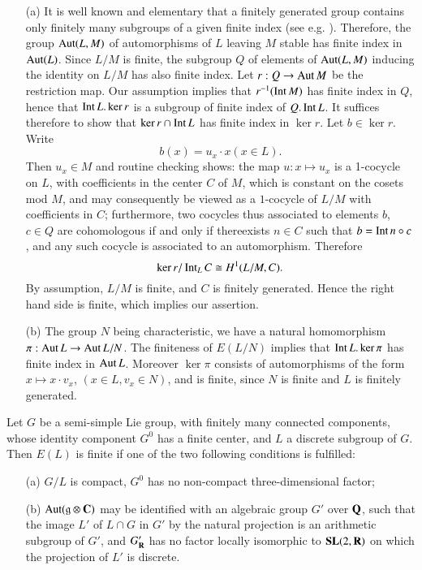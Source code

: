 \begin{itemize}
\item[(a)] It is well known and elementary that a finitely generated group contains only finitely many subgroups of a given finite index (see e.g. \cite{art04-key11}). Therefore, the group $\operatorname{\mathrm{Aut}} (L,M)$ of automorphisms of $L$ leaving $M$ stable has finite index in $\operatorname{\mathrm{Aut}}(L)$. Since $L/M$ is finite, the subgroup $Q$ of elements of $\operatorname{\mathrm{Aut}}(L,M)$ inducing the identity on $L/M$ has also finite index. Let $r:Q\to \operatorname{\mathrm{Aut}} M$ be the restriction map. Our assumption implies that $r^{-1}(\operatorname{\mathrm{Int}} M)$ has finite index in $Q$, hence that $\operatorname{\mathrm{Int}} L. \ker r$ is a subgroup of finite index of $Q. \operatorname{\mathrm{Int}} L$. It suffices therefore to show that $\ker r\cap \operatorname{\mathrm{Int}} L$ has finite index in $\ker r$. Let $b\in \ker r$. Write
$$
b(x)=u_{x}\cdot x(x\in L).
$$
Then $u_{x}\in M$ and routine checking shows: the map $u:x\mapsto u_{x}$ is a 1-cocycle on $L$, with coefficients in the center $C$ of $M$, which is constant on the cosets mod $M$, and may consequently be viewed as a $1$-cocycle of $L/M$ with coefficients in $C$; furthermore, two cocycles thus associated to elements $b$, $c\in Q$ are cohomologous if and only if there\pageoriginale exists $n\in C$ such that $b=\operatorname{\mathrm{Int}} n\circ c$, and any such cocycle is associated to an automorphism. Therefore
$$
\ker r/\operatorname{\mathrm{Int}}_{L}C\cong H^{1}(L/M,C).
$$
By assumption, $L/M$ is finite, and $C$ is finitely generated. Hence the right hand side is finite, which implies our assertion.

\item[(b)] The group $N$ being characteristic, we have a natural homomorphism $\pi:\operatorname{\mathrm{Aut}} L\to \operatorname{\mathrm{Aut}} L/N$. The finiteness of $E(L/N)$ implies that $\operatorname{\mathrm{Int}} L.\ker \pi$ has finite index in $\operatorname{\mathrm{Aut}} L$. Moreover $\ker \pi$ consists of automorphisms of the form $x\mapsto x\cdot v_{x}$, $(x\in L, v_{x}\in N)$, and is finite, since $N$ is finite and $L$ is finitely generated.
\end{itemize}

\begin{theorem}\label{art04-thm1.5}
Let $G$ be a semi-simple Lie group, with finitely many connected components, whose identity component $G^{0}$ has a finite center, and $L$ a discrete subgroup of $G$. Then $E(L)$ is finite if one of the two following conditions is fulfilled:
\begin{itemize}
\item[{\rm(a)}] $G/L$ is compact, $G^{0}$ has no non-compact three-dimensional factor;

\item[{\rm(b)}] $\operatorname{\mathrm{Aut}}(\mathfrak{g}\otimes \mathbf{C})$ may be identified with an algebraic group $G'$ over $\mathbf{Q}$, such that the image $L'$ of $L\cap G$ in $G'$ by the natural projection is an arithmetic subgroup of $G'$, and $G'_{\mathbf{R}}$ has no factor locally isomorphic to $\mathbf{SL}(2,\mathbf{R})$ on which the projection of $L'$ is discrete.
\end{itemize}
\end{theorem}

